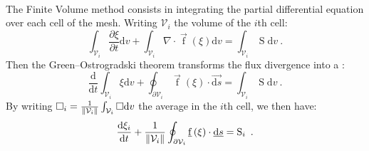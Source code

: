       \paragraph{}
      The Finite Volume method consists in integrating the partial differential equation over each cell of the mesh.
      Writing $\mathcal{V}_i$ the volume of the $i$th cell:
      \begin{equation}
        \int_{\mathcal{V}_i} \frac{\partial \xi}{\partial t} \mathrm{d}v + \int_{\mathcal{V}_i} \nabla\cdot \vec{\operatorname{f}}\left(\xi\right) \mathrm{d}v = \int_{\mathcal{V}_i} \operatorname{S} \mathrm{d}v\ .
      \end{equation}
      Then the Green--Ostrogradski theorem transforms the flux divergence into a :
      \begin{equation}
        \frac{\mathrm{d}}{\mathrm{d} t} \int_{\mathcal{V}_i} \xi\mathrm{d}v + \oint_{\partial\mathcal{V}_i} \vec{\operatorname{f}}\left(\xi\right) \cdot \vec{\mathrm{d}s} = \int_{\mathcal{V}_i} \operatorname{S} \mathrm{d}v\ .
      \end{equation}
      By writing $\square_i = \frac{1}{\norm{\mathcal{V}_i}} \int_{\mathcal{V}_i} \square \mathrm{d}v$ the average in the $i$th cell, we then have:
      \begin{equation}
        \frac{\mathrm{d}\xi_i}{\mathrm{d} t}  + \frac{1}{\norm{\mathcal{V}_i}} \oint_{\partial\mathcal{V}_i} \vec{\operatorname{f}}\left(\xi\right) \cdot \vec{\mathrm{d}s} = \operatorname{S}_i \ .
      \end{equation}


